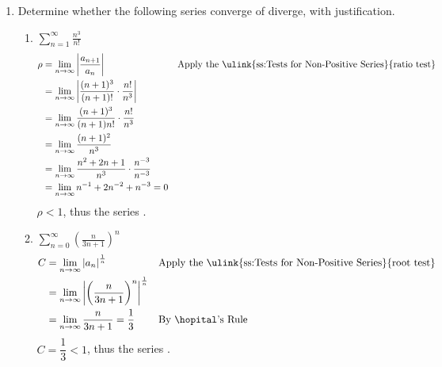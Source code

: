 \begin{enumerate}
\newpage %
  \item Determine whether the following series converge of diverge, with
    justification.
    \begin{enumerate}[itemsep=22em]
      \item \(\displaystyle \sum_{n=1}^{\infty} \frac{n^3}{n!} \)
      \begin{align*}
      \rho &= \lim_{n \to \infty} \left| \frac{a_{n+1}}{a_n}  \right|
           && \text{Apply the \ulink{ss:Tests for Non-Positive Series}{ratio test}} \\
           &= \lim_{n \to \infty} \left|
            \frac{(n+1)^3}{(n+1)!} \cdot \frac{n!}{n^3}
           \right| \\
           &= \lim_{n \to \infty}
           \frac{(n+1)^3}{(n+1)n!} \cdot \frac{n!}{n^3} \\
           &= \lim_{n \to \infty}
           \frac{(n+1)^2}{n^3} \\
           &= \lim_{n \to \infty}
           \frac{n^2 + 2n + 1}{n^3} \cdot \frac{n^{-3}}{n^{-3}} \\
           &= \lim_{n \to \infty}
           n^{-1} + 2n^{-2} + n^{-3} = 0
      \end{align*}
      \(\rho < 1\), thus the series .

      \vspace{-16em}
      \item \(\displaystyle \sum_{n=0}^{\infty} \left( \frac{n}{3n+1} \right)^n  \)
        \begin{align*}
          C &= \lim_{n \to \infty} \left| a_n \right|^\frac{1}{n}
           && \text{Apply the \ulink{ss:Tests for Non-Positive Series}{root test}} \\
           &= \lim_{n \to \infty}  \left|
              \left( \frac{n}{3n+1} \right)^n
           \right|^{\frac{1}{n}}\\
           &= \lim_{n \to \infty}  \frac{n}{3n +1} = \frac{1}{3}
           && \text{By \hopital's Rule} \\
        \end{align*}
        \(C = \dfrac{1}{3} < 1\), thus the series .
    \end{enumerate}

\newpage %


\end{enumerate}
